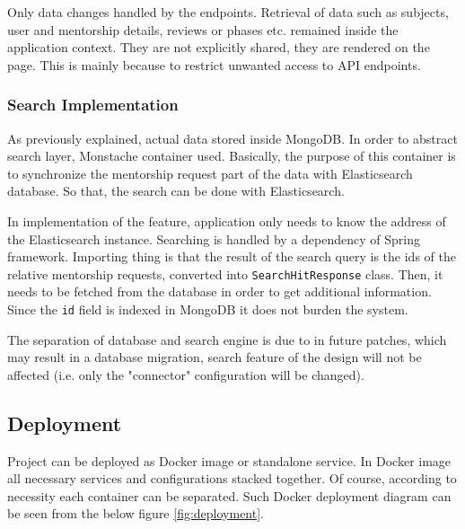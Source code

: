\documentclass[10pt]{article}
\begin{document}
Only data changes handled by the endpoints. Retrieval of data such as subjects,
user and mentorship details, reviews or phases etc. remained inside the application context.
They are not explicitly shared, they are rendered on the page. This is mainly because to restrict
unwanted access to API endpoints.


\subsubsection{Search Implementation}
As previously explained, actual data stored inside MongoDB. In order to abstract search layer,
Monstache container used. Basically, the purpose of this container is to synchronize the
mentorship request part of the data with Elasticsearch database. So that, the search can be
done with Elasticsearch.

In implementation of the feature, application only needs to know the address of the Elasticsearch
instance. Searching is handled by a dependency of Spring framework. Importing thing is that the
result of the search query is the ids of the relative mentorship requests, converted into
\texttt{SearchHitResponse} class. Then, it needs to be fetched from the database in order to get
additional information. Since the \texttt{id} field is indexed in MongoDB it does not burden the
system.

The separation of database and search engine is due to in future patches, which may
result in a database migration, search feature of the design will not be affected 
(i.e. only the "connector" configuration will be changed).
\newpage


\subsection{Deployment} \label{deployment}
Project can be deployed as Docker image or standalone service. In Docker image all necessary
services and configurations stacked together. Of course, according to necessity each container
can be separated. Such Docker deployment diagram can be seen from the below figure
\ref{fig:deployment}.
\end{document}
